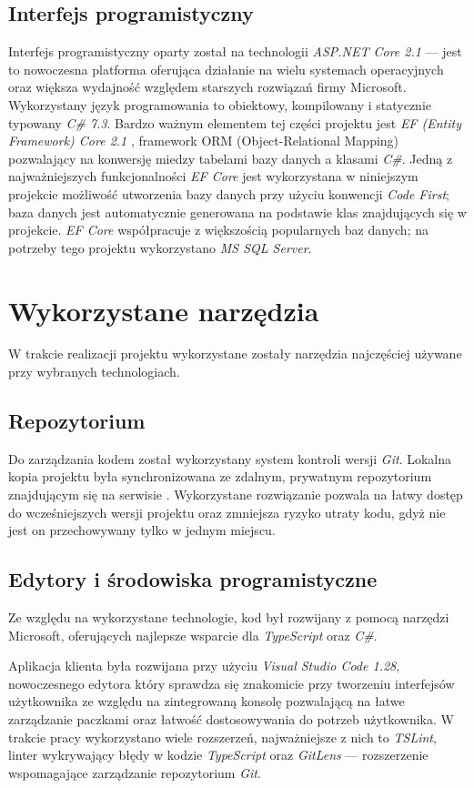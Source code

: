 \documentclass[eng,printmode,openany]{mgr}
\begin{document}
	\subsection{Interfejs programistyczny}
	Interfejs programistyczny oparty został na technologii \textit{ASP.NET Core 2.1} — jest to nowoczesna platforma oferująca działanie na wielu systemach operacyjnych oraz większa wydajność względem starszych rozwiązań firmy Microsoft. Wykorzystany język programowania to obiektowy, kompilowany i statycznie typowany \textit{C\# 7.3}. Bardzo ważnym elementem tej części projektu jest \textit{EF (Entity Framework) Core 2.1} \cite{msdn-efcore}, framework ORM (Object-Relational Mapping) pozwalający na konwersję miedzy tabelami bazy danych a klasami \textit{C\#}. Jedną z najważniejszych funkcjonalności \textit{EF Core} jest wykorzystana w niniejszym projekcie możliwość utworzenia bazy danych przy użyciu konwencji \textit{Code First}; baza danych jest automatycznie generowana na podstawie klas  znajdujących się w projekcie. \textit{EF Core} współpracuje z większością popularnych baz danych; na potrzeby tego projektu wykorzystano \textit{MS SQL Server}.
	
	\section{Wykorzystane narzędzia}
	W trakcie realizacji projektu wykorzystane zostały narzędzia najczęściej używane przy wybranych technologiach.
	\subsection{Repozytorium}
	Do zarządzania kodem został wykorzystany system kontroli wersji \textit{Git}. Lokalna kopia projektu była synchronizowana ze zdalnym, prywatnym repozytorium znajdującym się na serwisie . Wykorzystane rozwiązanie pozwala na łatwy dostęp do wcześniejszych wersji projektu oraz zmniejsza ryzyko utraty kodu, gdyż nie jest on przechowywany tylko w jednym miejscu.
	\subsection{Edytory i środowiska programistyczne}
	Ze względu na wykorzystane technologie, kod był rozwijany z pomocą narzędzi Microsoft, oferujących najlepsze wsparcie dla \textit{TypeScript} oraz \textit{C\#}. 
	
	Aplikacja klienta była rozwijana przy użyciu \textit{Visual Studio Code 1.28}, nowoczesnego edytora który sprawdza się znakomicie przy tworzeniu interfejsów użytkownika ze względu na zintegrowaną konsolę pozwalającą na łatwe zarządzanie paczkami oraz łatwość dostosowywania do potrzeb użytkownika. W trakcie pracy wykorzystano wiele rozszerzeń, najważniejsze z nich to \textit{TSLint}, linter wykrywający błędy w kodzie \textit{TypeScript} oraz \textit{GitLens} — rozszerzenie wspomagające zarządzanie repozytorium \textit{Git}.
	
\end{document}
